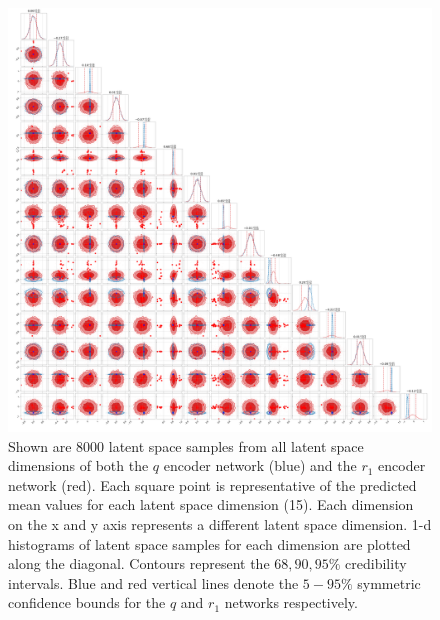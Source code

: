 %
%
\begin{figure}
    \includegraphics[width=\columnwidth]{figures/latent_pub_plot_event_184.png}
    \caption[Latent space samples corner plot for the 184th test sample in the \texttt{VItamin} paper training set.]{\label{fig:latent_corner_184} Shown are $8000$ latent space samples from all latent space dimensions of both 
    the $q$ encoder network (blue) and the $r_1$ encoder network (red). Each square point is representative of the predicted mean values for each latent space dimension (15). Each dimension on the x and y axis represents a different latent space dimension. 1-d histograms of latent space samples for each dimension are plotted along the diagonal. Contours represent the $68, 90, 95\%$ credibility intervals. Blue and red vertical lines denote the $5 - 95\%$ symmetric confidence bounds for the $q$ and $r_1$ networks respectively.}
\end{figure}

